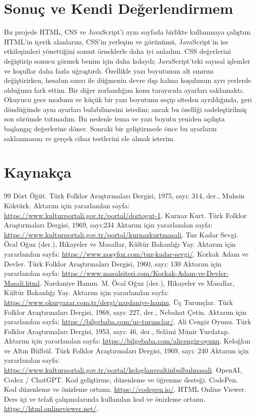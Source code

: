 \documentclass[12pt,a4paper]{article}
\begin{document}
\section{Sonuç ve Kendi Değerlendirmem}
Bu projede HTML, CSS ve JavaScript'i aynı sayfada birlikte kullanmaya çalıştım. HTML'in içerik alanlarını, CSS'in yerleşim ve görünümü, JavaScript'in ise etkileşimleri yönettiğini somut örneklerle daha iyi anladım. CSS değerlerini değiştirip sonucu görmek benim için daha kolaydı; JavaScript'teki sayısal işlemler ve koşullar daha fazla uğraştırdı. Özellikle yazı boyutunun alt sınırını değiştirirken, hesabın sınırı ile düğmenin devre dışı kalma koşulunun ayrı yerlerde olduğunu fark ettim. Bir diğer zorlandığım konu tarayıcıda ayarları saklamaktı. Okuyucu gece modunu ve küçük bir yazı boyutunu seçip siteden ayrıldığında, geri döndüğünde aynı ayarları bulabilmesini istedim; ancak bu özelliği sadeleştirilmiş son sürümde tutmadım. Bu nedenle tema ve yazı boyutu yeniden açılışta başlangıç değerlerine döner. Sonraki bir geliştirmede önce bu ayarların saklanmasını ve gerçek cihaz testlerini ele almak isterim.

\section{Kaynakça}


\begin{thebibliography}{99}
 Dört Öğüt. Türk Folklor Araştırmaları Dergisi, 1975, sayı: 314, der., Muhsin Köktürk. Aktarım için yararlanılan sayfa: \url{https://www.kulturportali.gov.tr/portal/dortogut-1}.
 Kurnaz Kurt. Türk Folklor Araştırmaları Dergisi, 1969, sayı:234 Aktarım için yararlanılan sayfa: \url{https://www.kulturportali.gov.tr/portal/kurnazkurtmasali}.
 Tuz Kadar Sevgi. Öcal Oğuz (der.), Hikayeler ve Masallar, Kültür Bakanlığı Yay. Aktarım için yararlanılan sayfa: \url{https://www.nosyfox.com/tuz-kadar-sevgi/}.
 Korkak Adam ve Devler. Türk Folklor Araştırmaları Dergisi, 1960, sayı: 130 Aktarım için yararlanılan sayfa: \url{https://www.masalsitesi.com/Korkak-Adam-ve-Devler-Masali.html}.
 Nardaniye Hanım. M. Öcal Oğuz (der.), Hikayeler ve Masallar, Kültür Bakanlığı Yay. Aktarım için yararlanılan sayfa: \url{https://www.okuryazar.com.tr/dergi/nardaniye-hanim}.
 Üç Turunçlar. Türk Folklor Araştırmaları Dergisi, 1968, sayı: 227, der., Nebahat Çetin. Aktarım için yararlanılan sayfa: \url{https://bilgebaba.com/uc-turunclar/}.
 Ali Cengiz Oyunu. Türk Folklor Araştırmaları Dergisi, 1953, sayı: 46, der., Selâmi Münir Yurdatap. Aktarım için yararlanılan sayfa: \url{https://bilgebaba.com/alicengiz-oyunu}.
 Keloğlan ve Altın Bülbül. Türk Folklor Araştırmaları Dergisi, 1969, sayı: 240 Aktarım için yararlanılan sayfa: \url{https://www.kulturportali.gov.tr/portal/keloglanvealtinbulbulmasali}.
 OpenAI, Codex / ChatGPT. Kod geliştirme, düzenleme ve öğrenme desteği.
 CodePen. Kod düzenleme ve önizleme ortamı. \url{https://codepen.io/}.
 HTML Online Viewer. Ders içi ve telafi çalışmalarında kullanılan kod ve önizleme ortamı. \url{https://html.onlineviewer.net/}.
\end{thebibliography}
\end{document}
